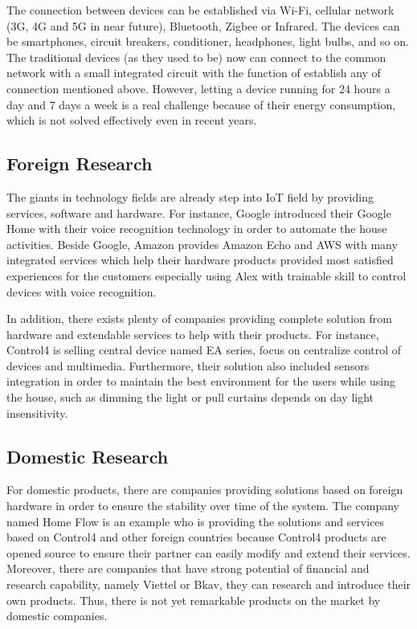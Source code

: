     The connection between devices can be established via Wi-Fi, cellular network (3G, 4G and 5G in near future), Bluetooth, Zigbee or Infrared. The devices can be smartphones, circuit breakers, conditioner, headphones, light bulbs, and so on. The traditional devices (as they used to be) now can connect to the common network with a small integrated circuit with the function of establish any of connection mentioned above. However, letting a device running for 24 hours a day and 7 days a week is a real challenge because of their energy consumption, which is not solved effectively even in recent years.
    \subsection{Foreign Research}
    The giants in technology fields are already step into IoT field by providing services, software and hardware. For instance, Google introduced their Google Home with their voice recognition technology in order to automate the house activities. Beside Google, Amazon provides Amazon Echo and AWS with many integrated services which help their hardware products provided most satisfied experiences for the customers especially using Alex with trainable skill to control devices with voice recognition.

    In addition, there exists plenty of companies providing complete solution from hardware and extendable services to help with their products. For instance, Control4 is selling central device named EA series, focus on centralize control of devices and multimedia. Furthermore, their solution also included sensors integration in order to maintain the best environment for the users while using the house, such as dimming the light or pull curtains depends on day light insensitivity. 
    \subsection{Domestic Research}
    For domestic products, there are companies providing solutions based on foreign hardware in order to ensure the stability over time of the system. The company named Home Flow is an example who is providing the solutions and services based on Control4 and other foreign countries because Control4 products are opened source to ensure their partner can easily modify and extend their services. Moreover, there are companies that have strong potential of financial and research capability, namely Viettel or Bkav, they can research and introduce their own products. Thus, there is not yet remarkable products on the market by domestic companies.

